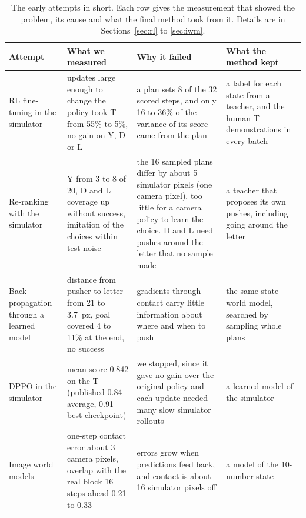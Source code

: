 \documentclass[10pt,twocolumn,letterpaper]{article}
\begin{document}
\begin{table}[t]
  \centering\small
  \caption{The early attempts in short. Each row gives the measurement that showed the problem, its cause and what the
  final method took from it. Details are in Sections~\ref{sec:rl} to \ref{sec:iwm}.}
  \label{tab:why}
  \renewcommand{\arraystretch}{1.15}
  \begin{tabular}{@{}>{\raggedright\arraybackslash}p{2.8cm}>{\raggedright\arraybackslash}p{3.9cm}%
    >{\raggedright\arraybackslash}p{5.5cm}>{\raggedright\arraybackslash}p{4.2cm}@{}}
    \toprule
    Attempt & What we measured & Why it failed & What the method kept \\
    \midrule
    RL fine-tuning in the simulator & updates large enough to change the policy took T from 55\% to 5\%, no gain on Y,
      D or L & a plan sets 8 of the 32 scored steps, and only 16 to 36\% of the variance of its score came from the
      plan & a label for each state from a teacher, and the human T demonstrations in every batch \\ \addlinespace
    Re-ranking with the simulator & Y from 3 to 8 of 20, D and L coverage up without success, imitation of the choices
      within test noise & the 16 sampled plans differ by about 5 simulator pixels (one camera pixel), too little for a
      camera policy to learn the choice. D and L need pushes around the letter that no sample made & a teacher that
      proposes its own pushes, including going around the letter \\ \addlinespace
    Back-propagation through a learned model & distance from pusher to letter from 21 to 3.7~px, goal covered 4 to 11\%
      at the end, no success & gradients through contact carry little information about where and when to push & the
      same state world model, searched by sampling whole plans \\ \addlinespace
    DPPO in the simulator & mean score 0.842 on the T (published 0.84 average, 0.91 best checkpoint) & we stopped, since
      it gave no gain over the original policy and each update needed many slow simulator rollouts & a learned model of
      the simulator \\ \addlinespace
    Image world models & one-step contact error about 3 camera pixels, overlap with the real block 16 steps ahead 0.21
      to 0.33 & errors grow when predictions feed back, and contact is about 16 simulator pixels off & a model of the
      10-number state \\
    \bottomrule
  \end{tabular}
\end{table}
\end{document}
